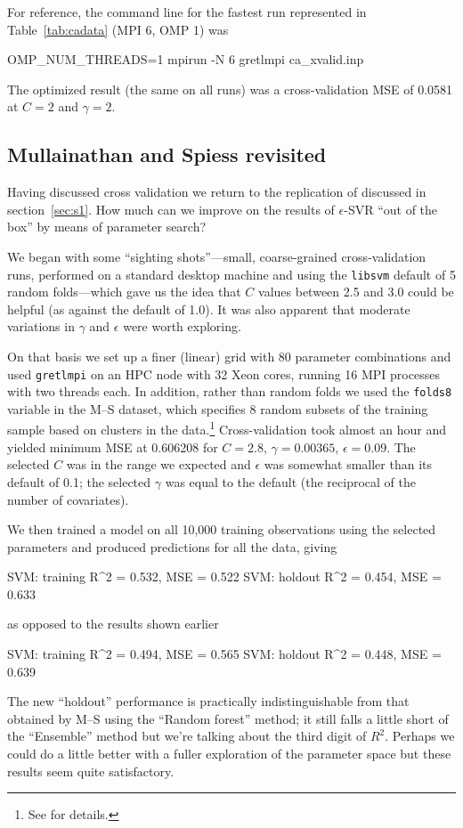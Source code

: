 \documentclass{article}
\begin{document}
For reference, the command line for the fastest run represented in
Table~\ref{tab:cadata} (MPI 6, OMP 1) was
\begin{code}
OMP_NUM_THREADS=1 mpirun -N 6 gretlmpi ca_xvalid.inp
\end{code}
The optimized result (the same on all runs) was a cross-validation MSE
of 0.0581 at $C=2$ and $\gamma=2$.


\subsection{Mullainathan and Spiess revisited}
\label{sec:ms-xvalid}

Having discussed cross validation we return to the replication of
\cite{mull-spiess17} discussed in section~\ref{sec:s1}. How much
can we improve on the results of $\epsilon$-SVR ``out of the
box'' by means of parameter search?

We began with some ``sighting shots''---small, coarse-grained
cross-validation runs, performed on a standard desktop machine and
using the \texttt{libsvm} default of 5 random folds---which gave us
the idea that $C$ values between 2.5 and 3.0 could be helpful (as
against the default of 1.0). It was also apparent that moderate
variations in $\gamma$ and $\epsilon$ were worth exploring.

On that basis we set up a finer (linear) grid with 80 parameter
combinations and used \texttt{gretlmpi} on an HPC node with 32 Xeon
cores, running 16 MPI processes with two threads each. In addition,
rather than random folds we used the \texttt{folds8} variable in the
M--S dataset, which specifies 8 random subsets of the training sample
based on clusters in the data.\footnote{See \cite{mull-spiess-17a} for
  details.}  Cross-validation took almost an hour and yielded minimum
MSE at 0.606208 for $C=2.8$, $\gamma=0.00365$, $\epsilon=0.09$. The
selected $C$ was in the range we expected and $\epsilon$ was somewhat
smaller than its default of 0.1; the selected $\gamma$ was equal to
the default (the reciprocal of the number of covariates).

We then trained a model on all 10,000 training observations using the
selected parameters and produced predictions for all the data, giving
\begin{code}
SVM: training R^2 = 0.532, MSE = 0.522
SVM: holdout  R^2 = 0.454, MSE = 0.633
\end{code}
as opposed to the results shown earlier
\begin{code}
SVM: training R^2 = 0.494, MSE = 0.565
SVM: holdout  R^2 = 0.448, MSE = 0.639
\end{code}
The new ``holdout'' performance is practically indistinguishable from
that obtained by M--S using the ``Random forest'' method; it still falls
a little short of the ``Ensemble'' method but we're talking about the
third digit of $R^2$. Perhaps we could do a little better with a
fuller exploration of the parameter space but these results seem
quite satisfactory.
\end{document}
